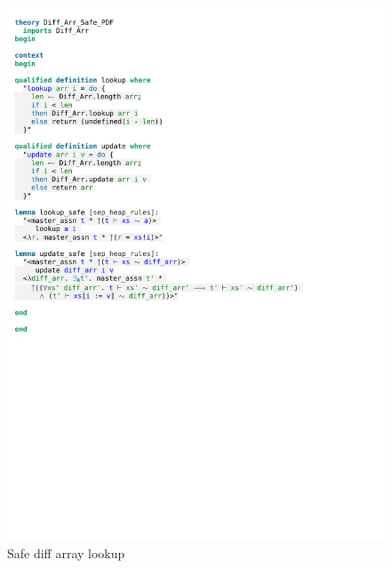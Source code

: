 \begin{figure}[htpb]
    \includegraphics[trim={0 22,6cm 0 3,8cm}, clip, width=1.00\textwidth]{figures/Theory_Diff_Arr_Safe.pdf}
    \caption[Safe diff array lookup]{Safe diff array lookup}
    \label{fig:diff_arr_lookup_safe}
\end{figure}

